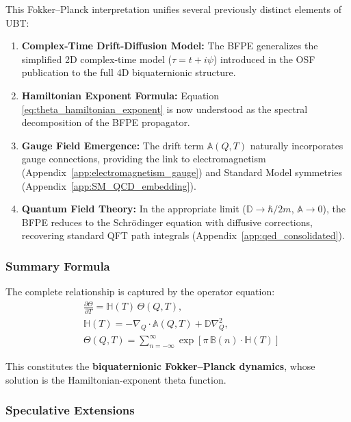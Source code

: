 This Fokker--Planck interpretation unifies several previously distinct elements of UBT:

\begin{enumerate}
\item \textbf{Complex-Time Drift-Diffusion Model:} The BFPE generalizes the simplified 2D complex-time model ($\tau = t + i\psi$) introduced in the OSF publication to the full 4D biquaternionic structure.

\item \textbf{Hamiltonian Exponent Formula:} Equation \eqref{eq:theta_hamiltonian_exponent} is now understood as the spectral decomposition of the BFPE propagator.

\item \textbf{Gauge Field Emergence:} The drift term $\mathbb{A}(Q,T)$ naturally incorporates gauge connections, providing the link to electromagnetism (Appendix~\ref{app:electromagnetism_gauge}) and Standard Model symmetries (Appendix~\ref{app:SM_QCD_embedding}).

\item \textbf{Quantum Field Theory:} In the appropriate limit ($\mathbb{D} \to \hbar/2m$, $\mathbb{A} \to 0$), the BFPE reduces to the Schrödinger equation with diffusive corrections, recovering standard QFT path integrals (Appendix~\ref{app:qed_consolidated}).
\end{enumerate}

\subsubsection{Summary Formula}

The complete relationship is captured by the operator equation:
\begin{equation}
\boxed{
\begin{aligned}
&\frac{\partial \Theta}{\partial T} = \mathbb{H}(T)\,\Theta(Q,T), \\[0.5em]
&\mathbb{H}(T) = -\nabla_Q \cdot \mathbb{A}(Q,T) + \mathbb{D}\nabla_Q^2, \\[0.5em]
&\Theta(Q, T) = \sum_{n=-\infty}^{\infty} \exp\!\left[\pi\,\mathbb{B}(n) \cdot \mathbb{H}(T)\right]
\end{aligned}
}
\label{eq:bfpe_complete}
\end{equation}

This constitutes the \textbf{biquaternionic Fokker--Planck dynamics}, whose solution is the Hamiltonian-exponent theta function.

\subsubsection{Speculative Extensions}

